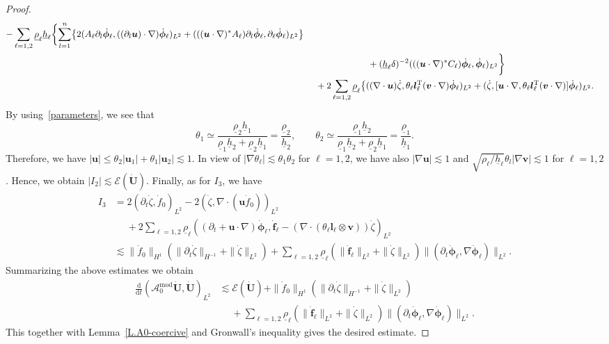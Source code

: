 \documentclass[11pt,leqno]{article}
\numberwithin{equation}{section}
\numberwithin{figure}{section}
\begin{document}
\begin{proof}
\begin{align*}
 -\sum_{\ell=1,2}\underline{\rho}_\ell\underline{h}_\ell \biggl\{ \sum_{l=1}^n \bigl\{
  2(A_\ell\partial_l\dot{\bm{\phi}}_\ell,((\partial_l\bm{u})\cdot\nabla)\dot{\bm{\phi}}_\ell)_{L^2}
  + (((\bm{u}\cdot\nabla)^*A_\ell)\partial_l\dot{\bm{\phi}}_\ell,\partial_\ell\dot{\bm{\phi}}_\ell)_{L^2} \bigr\} \\
&\makebox[7em]{}
 +(\underline{h}_\ell\delta)^{-2}(((\bm{u}\cdot\nabla)^*C_\ell)\dot{\bm{\phi}}_\ell,\dot{\bm{\phi}}_\ell)_{L^2} \biggr\} \\
&\quad\;
 +2\sum_{\ell=1,2}\underline{\rho}_\ell\bigl\{
  ((\nabla\cdot\bm{u})\dot{\zeta},\theta_\ell\bm{l}_\ell^\mathrm{T}(\bm{v}\cdot\nabla)\dot{\bm{\phi}}_\ell)_{L^2}
  + (\dot{\zeta}, [\bm{u}\cdot\nabla,\theta_\ell\bm{l}_\ell^\mathrm{T}(\bm{v}\cdot\nabla)]\dot{\bm{\phi}}_\ell)_{L^2}.
\end{align*}
%
By using~\eqref{parameters}, we see that 
%
\[
\theta_1 \simeq \frac{\underline{\rho}_2\underline{h}_1}{\underline{\rho}_1\underline{h}_2 + \underline{\rho}_2\underline{h}_1}
 = \frac{\underline{\rho}_2}{\underline{h}_2}, \qquad
\theta_2 \simeq \frac{\underline{\rho}_1\underline{h}_2}{\underline{\rho}_1\underline{h}_2 + \underline{\rho}_2\underline{h}_1}
 = \frac{\underline{\rho}_1}{\underline{h}_1}.
\]
%
Therefore, we have $|\bm{u}| \leq \theta_2|\bm{u}_1|+\theta_1|\bm{u}_2| \lesssim 1$. 
In view of $|\nabla\theta_\ell| \lesssim \theta_1\theta_2$ for $\ell=1,2$, we have also $|\nabla\bm{u}| \lesssim 1$ and 
$\sqrt{\rho_\ell/\underline{h}_\ell}\theta_l|\nabla\bm{v}| \lesssim 1$ for $\ell=1,2$. 
Hence, we obtain $|I_2| \lesssim \mathscr{E}(\dot{\bm{U}})$. 
Finally, as for $I_3$, we have 
%
\begin{align*}
I_3 &= 2(\partial_t\dot{\zeta},\dot{f}_0)_{L^2} -2 (\dot{\zeta},\nabla\cdot(\bm{u}\dot{f}_0))_{L^2} \\
&\quad\;
 +2\sum_{\ell=1,2}\underline{\rho}_\ell((\partial_t+\bm{u}\cdot\nabla)\dot{\bm{\phi}}_\ell,
  \dot{\bm{f}}_\ell - (\nabla\cdot(\theta_\ell\bm{l}_\ell\otimes\bm{v}))\dot{\zeta})_{L^2} \\
&\lesssim \|\dot{f}_0\|_{H^1}( \|\partial_t\dot{\zeta}\|_{H^{-1}}+\|\dot{\zeta}\|_{L^2} )
 + \sum_{\ell=1,2}\underline{\rho}_\ell( \|\dot{\bm{f}}_\ell\|_{L^2} + \|\dot{\zeta}\|_{L^2})
  \|(\partial_t\dot{\bm{\phi}}_\ell,\nabla\dot{\bm{\phi}}_\ell)\|_{L^2}.
\end{align*}
%
Summarizing the above estimates we obtain 
%
\begin{align*}
\frac{\mathrm{d}}{\mathrm{d}t}(\mathscr{A}_0^\mathrm{mod}\dot{\bm{U}},\dot{\bm{U}})_{L^2}
&\lesssim \mathscr{E}(\dot{\bm{U}}) + 
 \|\dot{f}_0\|_{H^1}( \|\partial_t\dot{\zeta}\|_{H^{-1}}+\|\dot{\zeta}\|_{L^2} ) \\
&\quad\;
 + \sum_{\ell=1,2}\underline{\rho}_\ell( \|\dot{\bm{f}}_\ell\|_{L^2} + \|\dot{\zeta}\|_{L^2})
  \|(\partial_t\dot{\bm{\phi}}_\ell,\nabla\dot{\bm{\phi}}_\ell)\|_{L^2}.
\end{align*}
%
This together with Lemma~\ref{L.A0-coercive} and Gronwall's inequality gives the desired estimate. 
\end{proof}
\end{document}
